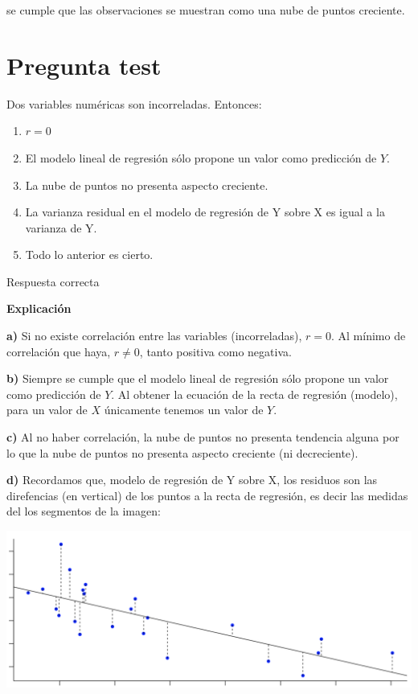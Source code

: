 \documentclass[
]{book}
\providecommand{\tightlist}{%
  \setlength{\itemsep}{0pt}\setlength{\parskip}{0pt}}
\begin{document}
se cumple que las observaciones se muestran como una nube de puntos creciente.

\hypertarget{pregunta-test-124}{%
\section{Pregunta test}\label{pregunta-test-124}}

Dos variables numéricas son incorreladas. Entonces:

\begin{enumerate}
\def\labelenumi{\alph{enumi})}
\tightlist
\item
  \(r = 0\)
\item
  El modelo lineal de regresión sólo propone un valor como predicción de \(Y\).
\item
  La nube de puntos no presenta aspecto creciente.
\item
  La varianza residual en el modelo de regresión de Y sobre X es igual a la varianza de Y.
\item
  Todo lo anterior es cierto.
\end{enumerate}

Respuesta correcta

\textbf{Explicación}

\textbf{a)} Si no existe correlación entre las variables (incorreladas), \(r=0\). Al mínimo de correlación que haya, \(r \neq 0\), tanto positiva como negativa.

\textbf{b)} Siempre se cumple que el modelo lineal de regresión sólo propone un valor como predicción de \(Y\). Al obtener la ecuación de la recta de regresión (modelo), para un valor de \(X\) únicamente tenemos un valor de \(Y\).

\textbf{c)} Al no haber correlación, la nube de puntos no presenta tendencia alguna por lo que la nube de puntos no presenta aspecto creciente (ni decreciente).

\textbf{d)} Recordamos que, modelo de regresión de Y sobre X, los residuos son las direfencias (en vertical) de los puntos a la recta de regresión, es decir las medidas del los segmentos de la imagen:

\includegraphics[width=23.72in]{img/4_2}
\end{document}
